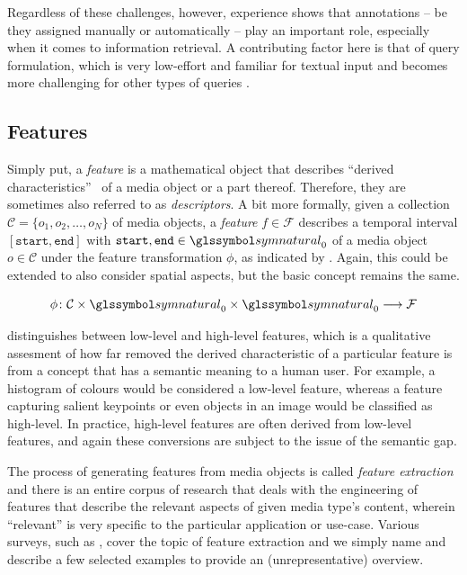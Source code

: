Regardless of these challenges, however, experience shows that annotations -- be they assigned manually or automatically -- play an important role, especially when it comes to information retrieval. A contributing factor here is that of query formulation, which is very low-effort and familiar for textual input and becomes more challenging for other types of queries .

\subsection{Features}
Simply put, a \emph{feature} is a mathematical object that describes ``derived characteristics''~\cite{Blanken:2007multimedia} of a media object or a part thereof. Therefore, they are sometimes also referred to as \emph{descriptors}. A bit more formally, given a collection $\mathcal{C} = \lbrace o_1, o_2, \ldots, o_N \rbrace$ of media objects, a \emph{feature} $f \in \mathcal{F}$ describes a temporal interval $[ \texttt{start}, \texttt{end} ]$ with $\texttt{start},\texttt{end} \in \symnatural_0$ of a media object $o \in \mathcal{C}$ under the feature transformation $\phi$, as indicated by . Again, this could be extended to also consider spatial aspects, but the basic concept remains the same.

\begin{equation}
    \label{eq:feature_transformation}
    \phi \colon \mathcal{C} \times \symnatural_0 \times \symnatural_0 \longrightarrow \mathcal{F}
\end{equation}

\cite{Blanken:2007multimedia} distinguishes between low-level and high-level features, which is a qualitative assesment of how far removed the derived characteristic of a particular feature is from a concept that has a semantic meaning to a human user. For example, a histogram of colours would be considered a low-level feature, whereas a feature capturing salient keypoints or even objects in an image would be classified as high-level. In practice, high-level features are often derived from low-level features, and again these conversions are subject to the issue of the semantic gap.

The process of generating features from media objects is called \emph{feature extraction} \cite{Blanken:2007multimedia} and there is an entire corpus of research that deals with the engineering of features that describe the relevant aspects of given media type's content, wherein ``relevant'' is very specific to the particular application or use-case. Various surveys, such as \cite{Ding:2012ASurvey,McKinney:2003Features,Salau:2019Feature}, cover the topic of feature extraction and we simply name and describe a few selected examples to provide an (unrepresentative) overview. 

